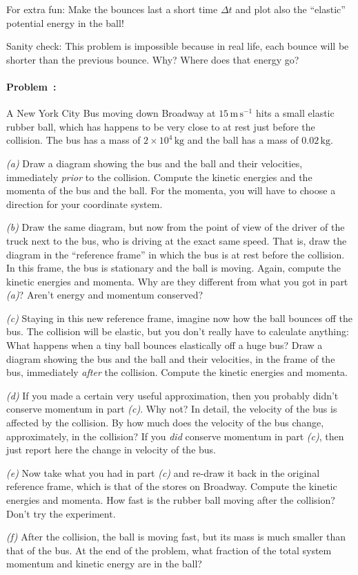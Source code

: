 \documentclass[12pt]{article}
\newcommand{\kg}{\mathrm{kg}}
\newcommand{\m}{\mathrm{m}}
\newcommand{\s}{\mathrm{s}}
\newcommand{\mps}{\m\,\s^{-1}}
\newcounter{problem}
\begin{document}
For extra fun: Make the bounces last a short time $\Delta t$ and plot
also the ``elastic'' potential energy in the ball!

Sanity check: This problem is impossible because in real life, each
bounce will be shorter than the previous bounce.  Why?  Where does
that energy go?

\paragraph{Problem~\theproblem:}%
A New York City Bus moving down Broadway at $15\,\mps$ hits a small
elastic rubber ball, which has happens to be very close to at rest
just before the collision.  The bus has a mass of $2\times 10^4\,\kg$
and the ball has a mass of $0.02\,\kg$.

\textsl{(a)} Draw a diagram showing the bus and the ball and their
velocities, immediately \emph{prior} to the collision.  Compute the
kinetic energies and the momenta of the bus and the ball.  For the
momenta, you will have to choose a direction for your coordinate
system.

\textsl{(b)} Draw the same diagram, but now from the point of view of
the driver of the truck next to the bus, who is driving at the exact
same speed.  That is, draw the diagram in the ``reference frame'' in
which the bus is at rest before the collision.  In this frame, the bus
is stationary and the ball is moving.  Again, compute the kinetic
energies and momenta.  Why are they different from what you got in
part \textsl{(a)}?  Aren't energy and momentum conserved?

\textsl{(c)} Staying in this new reference frame, imagine now
how the ball bounces off the bus.  The collision will be elastic, but
you don't really have to calculate anything: What happens when a tiny
ball bounces elastically off a huge bus?  Draw a diagram showing the
bus and the ball and their velocities, in the frame of the bus,
immediately \emph{after} the collision.  Compute the kinetic energies
and momenta.

\textsl{(d)} If you made a certain very useful approximation, then you
probably didn't conserve momentum in part \textsl{(c)}.  Why not?  In
detail, the velocity of the bus is affected by the collision.  By how
much does the velocity of the bus change, approximately, in the
collision?  If you \emph{did} conserve momentum in part \textsl{(c)},
then just report here the change in velocity of the bus.

\textsl{(e)} Now take what you had in part \textsl{(c)} and re-draw it
back in the original reference frame, which is that of the stores on
Broadway.  Compute the kinetic energies and momenta.  How fast is the
rubber ball moving after the collision?  Don't try the experiment.

\textsl{(f)} After the collision, the ball is moving fast, but its
mass is much smaller than that of the bus.  At the end of the problem,
what fraction of the total system momentum and kinetic energy are in
the ball?
\end{document}
